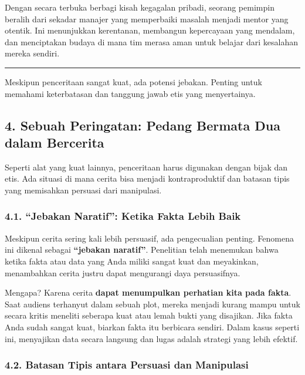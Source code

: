 \documentclass[
  letterpaper,
  DIV=11,
  numbers=noendperiod]{scrreprt}
\begin{document}
Dengan secara terbuka berbagi kisah kegagalan pribadi, seorang pemimpin
beralih dari sekadar manajer yang memperbaiki masalah menjadi mentor
yang otentik. Ini menunjukkan kerentanan, membangun kepercayaan yang
mendalam, dan menciptakan budaya di mana tim merasa aman untuk belajar
dari kesalahan mereka sendiri.

\begin{center}\rule{0.5\linewidth}{0.5pt}\end{center}

Meskipun penceritaan sangat kuat, ada potensi jebakan. Penting untuk
memahami keterbatasan dan tanggung jawab etis yang menyertainya.

\subsection{4. Sebuah Peringatan: Pedang Bermata Dua dalam
Bercerita}\label{sebuah-peringatan-pedang-bermata-dua-dalam-bercerita}

Seperti alat yang kuat lainnya, penceritaan harus digunakan dengan bijak
dan etis. Ada situasi di mana cerita bisa menjadi kontraproduktif dan
batasan tipis yang memisahkan persuasi dari manipulasi.

\subsubsection{4.1. ``Jebakan Naratif'': Ketika Fakta Lebih
Baik}\label{jebakan-naratif-ketika-fakta-lebih-baik}

Meskipun cerita sering kali lebih persuasif, ada pengecualian penting.
Fenomena ini dikenal sebagai \textbf{``jebakan naratif''}. Penelitian
telah menemukan bahwa ketika fakta atau data yang Anda miliki sangat
kuat dan meyakinkan, menambahkan cerita justru dapat mengurangi daya
persuasifnya.

Mengapa? Karena cerita \textbf{dapat menumpulkan perhatian kita pada
fakta}. Saat audiens terhanyut dalam sebuah plot, mereka menjadi kurang
mampu untuk secara kritis meneliti seberapa kuat atau lemah bukti yang
disajikan. Jika fakta Anda sudah sangat kuat, biarkan fakta itu
berbicara sendiri. Dalam kasus seperti ini, menyajikan data secara
langsung dan lugas adalah strategi yang lebih efektif.

\subsubsection{4.2. Batasan Tipis antara Persuasi dan
Manipulasi}\label{batasan-tipis-antara-persuasi-dan-manipulasi}
\end{document}
